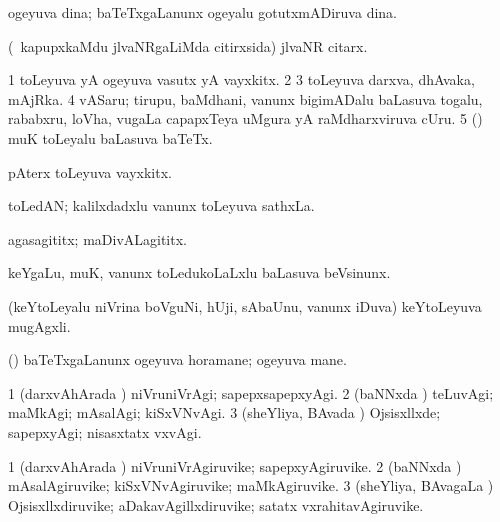 {\bentry
{} 
\gl{\nA}
\expl{}
\bmng
ogeyuva dina; baTeTxgaLanunx ogeyalu gotutxmADiruva dina. 
\emng
\eentry

\bentry
{} 
\gl{\nA}
\expl{}
\bmng
(\kanmu\ kapupxkaMdu jlvaNRgaLiMda citirxsida) jlvaNR citarx. 
\emng
\eentry

\bentry
{} 
\gl{\nA}
\expl{}
\bmng
\bnum
\num{1} toLeyuva yA ogeyuva vasutx yA vayxkitx. 
\num{2}  
\num{3} toLeyuva darxva, dhAvaka, mAjRka. 
\num{4} vASaru; tirupu, baMdhani, \mo vanunx bigimADalu baLasuva togalu, rababxru, loVha, \mo vugaLa capapxTeya uMgura yA raMdharxviruva cUru. 
\num{5} (\AseTxrXV) muK toLeyalu baLasuva baTeTx. 
\enum
\emng
\eentry

\bentry
{} 
\gl{\nA}
\bmng
pAterx toLeyuva vayxkitx. 
\emng
\eentry

\bentry
{} 
\gl{\nA}
\expl{}
\bmng
toLedAN; kalilxdadxlu \mo vanunx toLeyuva sathxLa. 
\emng
\eentry

\bentry
{} 
\gl{\nA}
\bmng
agasagititx; maDivALagititx. 
\emng
\eentry

\bentry
{} 
\gl{\nA}
\expl{}
\bmng
{} 
\emng
\eentry

\bentry
{} 
\gl{\nA}
\expl{}
\bmng
keYgaLu, muK, \mo vanunx toLedukoLaLxlu baLasuva beVsinunx. 
\emng
\eentry

\bentry
{} 
\gl{\nA}
\expl{}
\bmng
(keYtoLeyalu niVrina boVguNi, hUji, sAbaUnu, \mo vanunx iDuva) keYtoLeyuva mugAgxli. 
\emng
\eentry

\bentry
{} 
\gl{\nA}
\expl{}
\bmng
(\kanmu) baTeTxgaLanunx ogeyuva horamane; ogeyuva mane. 
\emng
\eentry

\bentry
{} 
\gl{\kirxvi}
\expl{}
\bmng
\bnum
\num{1} (darxvAhArada \vi) niVruniVrAgi; sapepxsapepxyAgi. 
\num{2} (baNNxda \vi) teLuvAgi; maMkAgi; mAsalAgi; kiSxVNvAgi. 
\num{3} (sheYliya, BAvada \vi) Ojsisxllxde; sapepxyAgi; nisasxtatx vxvAgi. 
\enum
\emng
\eentry

\bentry
{} 
\gl{\nA}
\expl{}
\bmng
\bnum
\num{1} (darxvAhArada \vi) niVruniVrAgiruvike; sapepxyAgiruvike. 
\num{2} (baNNxda \vi) mAsalAgiruvike; kiSxVNvAgiruvike; maMkAgiruvike. 
\num{3} (sheYliya, BAvagaLa \vi) Ojsisxllxdiruvike; aDakavAgillxdiruvike; satatx vxrahitavAgiruvike. 
\enum
\emng
\eentry

}
